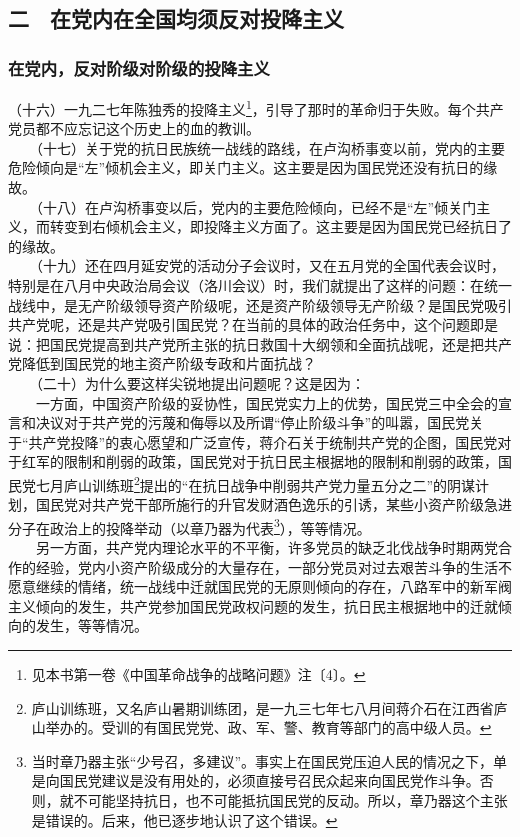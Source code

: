 \documentclass[cn,11pt,chinese]{elegantbook}
\def\myformat#1{\hfil\hfil #1}
\begin{document}
\subsection*{\myformat{二　在党内在全国均须反对投降主义}}
\subsubsection*{\myformat{在党内，反对阶级对阶级的投降主义}}
（十六）一九二七年陈独秀的投降主义\footnote[6]{ 见本书第一卷《中国革命战争的战略问题》注〔4〕。}，引导了那时的革命归于失败。每个共产党员都不应忘记这个历史上的血的教训。\\
　　（十七）关于党的抗日民族统一战线的路线，在卢沟桥事变以前，党内的主要危险倾向是“左”倾机会主义，即关门主义。这主要是因为国民党还没有抗日的缘故。\\
　　（十八）在卢沟桥事变以后，党内的主要危险倾向，已经不是“左”倾关门主义，而转变到右倾机会主义，即投降主义方面了。这主要是因为国民党已经抗日了的缘故。\\
　　（十九）还在四月延安党的活动分子会议时，又在五月党的全国代表会议时，特别是在八月中央政治局会议（洛川会议）时，我们就提出了这样的问题：在统一战线中，是无产阶级领导资产阶级呢，还是资产阶级领导无产阶级？是国民党吸引共产党呢，还是共产党吸引国民党？在当前的具体的政治任务中，这个问题即是说：把国民党提高到共产党所主张的抗日救国十大纲领和全面抗战呢，还是把共产党降低到国民党的地主资产阶级专政和片面抗战？\\
　　（二十）为什么要这样尖锐地提出问题呢？这是因为：\\
　　一方面，中国资产阶级的妥协性，国民党实力上的优势，国民党三中全会的宣言和决议对于共产党的污蔑和侮辱以及所谓“停止阶级斗争”的叫嚣，国民党关于“共产党投降”的衷心愿望和广泛宣传，蒋介石关于统制共产党的企图，国民党对于红军的限制和削弱的政策，国民党对于抗日民主根据地的限制和削弱的政策，国民党七月庐山训练班\footnote[7]{ 庐山训练班，又名庐山暑期训练团，是一九三七年七八月间蒋介石在江西省庐山举办的。受训的有国民党党、政、军、警、教育等部门的高中级人员。}提出的“在抗日战争中削弱共产党力量五分之二”的阴谋计划，国民党对共产党干部所施行的升官发财酒色逸乐的引诱，某些小资产阶级急进分子在政治上的投降举动（以章乃器为代表\footnote[8]{ 当时章乃器主张“少号召，多建议”。事实上在国民党压迫人民的情况之下，单是向国民党建议是没有用处的，必须直接号召民众起来向国民党作斗争。否则，就不可能坚持抗日，也不可能抵抗国民党的反动。所以，章乃器这个主张是错误的。后来，他已逐步地认识了这个错误。}），等等情况。\\
　　另一方面，共产党内理论水平的不平衡，许多党员的缺乏北伐战争时期两党合作的经验，党内小资产阶级成分的大量存在，一部分党员对过去艰苦斗争的生活不愿意继续的情绪，统一战线中迁就国民党的无原则倾向的存在，八路军中的新军阀主义倾向的发生，共产党参加国民党政权问题的发生，抗日民主根据地中的迁就倾向的发生，等等情况。\\
\end{document}
